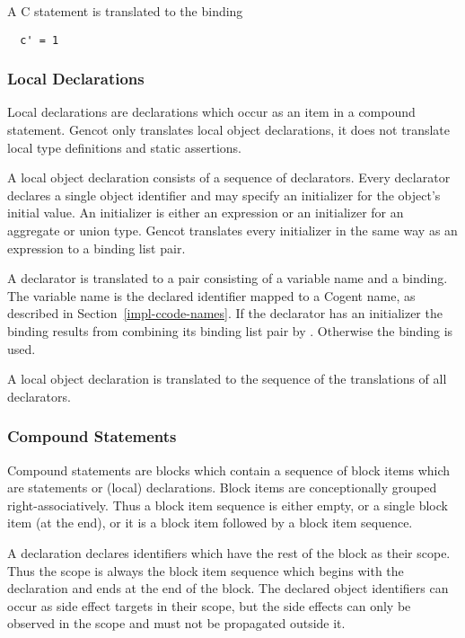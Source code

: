 A C  statement is translated to the binding
\begin{verbatim}
  c' = 1
\end{verbatim}

\subsubsection{Local Declarations}

Local declarations are declarations which occur as an item in a compound statement. Gencot only translates local object declarations, 
it does not translate local type definitions and static assertions. 

A local object declaration consists of a sequence of declarators. Every declarator declares a single object identifier and may 
specify an initializer for the object's initial value. An initializer is either an expression or an initializer for an aggregate or
union type. Gencot translates every initializer in the same way as an expression to a binding list pair.

A declarator is translated to a pair consisting of a variable name and a binding. The variable name is the declared identifier
mapped to a Cogent name, as described in Section~\ref{impl-ccode-names}. If the declarator has an initializer the binding
results from combining its binding list pair by . Otherwise the binding  is used.

A local object declaration is translated to the sequence of the translations of all declarators.

\subsubsection{Compound Statements}

Compound statements are blocks which contain a sequence of block items which are statements or (local) declarations. Block items 
are conceptionally grouped right-associatively. Thus a block item sequence is either empty, or a single block item
(at the end), or it is a block item followed by a block item sequence.

A declaration declares identifiers which have the rest of the block as their scope. Thus the scope is always the block item sequence
which begins with the declaration and ends at the end of the block. The declared object identifiers can occur as side
effect targets in their scope, but the side effects can only be observed in the scope and must not be propagated outside it.

